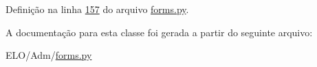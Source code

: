 Definição na linha \hyperlink{Adm_2forms_8py_source_l00157}{157} do arquivo \hyperlink{Adm_2forms_8py_source}{forms.\-py}.



A documentação para esta classe foi gerada a partir do seguinte arquivo\-:\begin{DoxyCompactItemize}
\item 
E\-L\-O/\-Adm/\hyperlink{Adm_2forms_8py}{forms.\-py}\end{DoxyCompactItemize}
